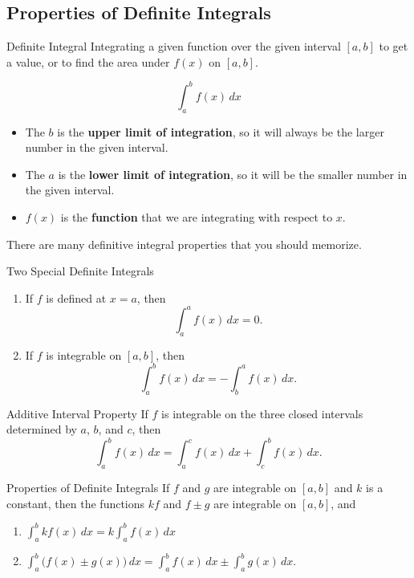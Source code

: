 \documentclass[12pt]{article}
\theoremstyle{beautifulthm}
\begin{document}
\newpage

\subsection{Properties of Definite Integrals}
\begin{Definition}{Definite Integral}{}
Integrating a given function over the given interval $[a, b]$ to get a value, or to find the area under $f(x)$ on $[a, b]$.

\[
\int_a^b f(x) \, dx
\]


\begin{itemize}
    \item The $b$ is the \textbf{upper limit of integration}, so it will always be the larger number in the given interval.
    \item The $a$ is the \textbf{lower limit of integration}, so it will be the smaller number in the given interval.
    \item $f(x)$ is the \textbf{function} that we are integrating with respect to $x$.
\end{itemize}
    
\end{Definition}
There are many definitive integral properties that you should memorize.

\begin{mytheorem}{Two Special Definite Integrals}{}
    \begin{enumerate}
    \item If $f$ is defined at $x = a$, then
    \[
    \int_a^a f(x) \, dx = 0.
    \]
    
    \item If $f$ is integrable on $[a, b]$, then
    \[
    \int_a^b f(x) \, dx = -\int_b^a f(x) \, dx.
    \]
\end{enumerate}
\end{mytheorem}


\begin{mytheorem}{Additive Interval Property}{}
    If $f$ is integrable on the three closed intervals determined by $a$, $b$, and $c$, then
\[
\int_a^b f(x) \, dx = \int_a^c f(x) \, dx + \int_c^b f(x) \, dx.
\]
\end{mytheorem}



\begin{mytheorem}{Properties of Definite Integrals}{}
    If $f$ and $g$ are integrable on $[a, b]$ and $k$ is a constant, then the functions $kf$ and $f \pm g$ are integrable on $[a, b]$, and
\begin{enumerate}
    \item $\int_a^b kf(x) \, dx = k \int_a^b f(x) \, dx$
    \item $\int_a^b \big(f(x) \pm g(x)\big) \, dx = \int_a^b f(x) \, dx \pm \int_a^b g(x) \, dx.$
\end{enumerate}
\end{mytheorem}
\end{document}
